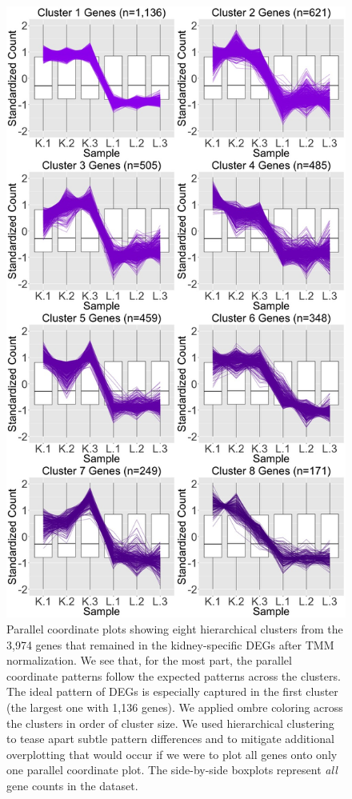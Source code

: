 \documentclass{article}
\begin{document}
  \null
  \begin{figure}[t!]
  \centerline{\includegraphics[width=0.65\columnwidth]{../MakeFigures/lkClustersKeep.jpg}}
  \caption{Parallel coordinate plots showing eight hierarchical clusters from the 3,974 genes that remained in the kidney-specific DEGs after TMM normalization. We see that, for the most part, the parallel coordinate patterns follow the expected patterns across the clusters. The ideal pattern of DEGs is especially captured in the first cluster (the largest one with 1,136 genes). We applied ombre coloring across the clusters in order of cluster size. We used hierarchical clustering to tease apart subtle pattern differences and to mitigate additional overplotting that would occur if we were to plot all genes onto only one parallel coordinate plot. The side-by-side boxplots represent \textit{all} gene counts in the dataset.
  \label{lkClustersKeep}}
  \end{figure}
  
\end{document}
